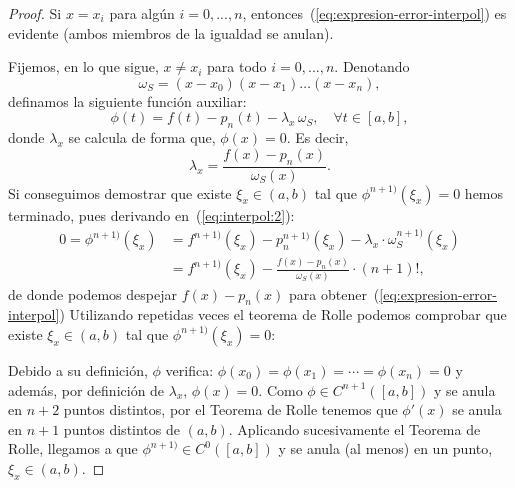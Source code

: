     \begin{proof}
      Si $x=x_i$ para algún $i=0,...,n$,
      entonces~(\ref{eq:expresion-error-interpol}) es evidente (ambos
      miembros de la igualdad se anulan).

      Fijemos, en lo que sigue, $x\neq x_i$ para todo $i=0,...,n$. Denotando
      \begin{equation}
      \omega_S=(x-x_0)(x-x_1)\dots (x-x_n),
     \label{eq:w_S:3} 
    \end{equation}
      definamos la siguiente función auxiliar:
      \begin{equation}
        \phi(t)=f(t)-p_n(t)-\lambda_x\, \omega_S, \quad \forall t\in[a,b],
      \label{eq:interpol:2}
    \end{equation}
      donde $\lambda_x$ se calcula de forma que, $\phi(x)=0$. Es
      decir,
      $$
      \lambda_x = \frac{f(x)-p_n(x)}{\omega_S(x)}.
      $$
      Si conseguimos demostrar que existe $\xi_x\in (a,b)$ tal que
      $\phi^{n+1)}(\xi_x)=0$ hemos terminado, pues derivando
      en~(\ref{eq:interpol:2}):
      \begin{align*}
        0=\phi^{n+1)}(\xi_x)&=f^{n+1)}(\xi_x)-p_n^{n+1)}(\xi_x)-\lambda_x\cdot\omega_S^{n+1)}(\xi_x)
        \\
        &=f^{n+1)}(\xi_x)- \frac{f(x)-p_n(x)}{\omega_S(x)}\cdot (n+1)!,
      \end{align*}
      de donde podemos despejar $f(x)-p_n(x)$ para
      obtener~(\ref{eq:expresion-error-interpol}) 
      Utilizando repetidas veces el teorema de Rolle podemos comprobar que
      existe $\xi_x\in (a,b)$ tal que $\phi^{n+1)}(\xi_x)=0$:

      Debido a su definición, $\phi$ verifica:
      $\phi(x_0)=\phi(x_1)=\cdots=\phi(x_n)=0$ y además, por definición de
      $\lambda_x$, $\phi(x)=0$. Como $\phi\in C^{n+1}([a,b])$ y se anula
      en $n+2$ puntos distintos, por el Teorema de Rolle tenemos que
      $\phi'(x)$ se anula en $n+1$ puntos distintos de $(a,b)$. Aplicando
      sucesivamente el Teorema de Rolle, llegamos a que $\phi^{n+1)}\in
      C^0([a,b])$ y se anula (al menos) en un punto, $\xi_x\in (a,b)$.
    \end{proof}


